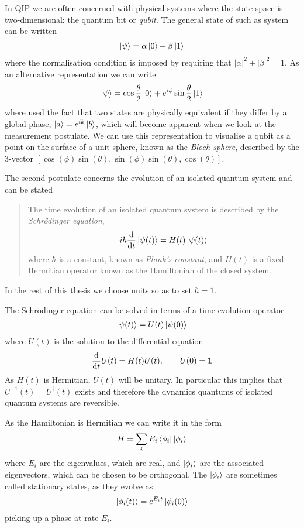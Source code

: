 In QIP we are often concerned with physical systems where the state space is two-dimensional: the quantum bit or \textit{qubit}. The general state of such as system can be written
\begin{align}
  \left\vert\psi\right\rangle = \alpha\left\vert0\right\rangle + \beta\left\vert1\right\rangle
\end{align}
where the normalisation condition is imposed by requiring that $|\alpha|^2 + |\beta|^2 = 1$. As an alternative representation we can write
\begin{align}
  \left\vert\psi\right\rangle = \cos\frac{\theta}{2}\left\vert0\right\rangle + e^{i\phi}\sin\frac{\theta}{2}\left\vert1\right\rangle
\end{align}
where used the fact that two states are physically equivalent if they differ by a global phase, $\left\vert a\right\rangle = e^{ik}\left\vert b\right\rangle$, which will become apparent when we look at the measurement postulate. We can use this representation to visualise a qubit as a point on the surface of a unit sphere, known as the \textit{Bloch sphere}, described by the $3$-vector $[\cos(\phi)\sin(\theta), \sin(\phi)\sin(\theta), \cos(\theta)]$.

The second postulate concerns the evolution of an isolated quantum system and can be stated
\begin{quotation}
The time evolution of an isolated quantum system is described by the \textit{Schr\"odinger equation},
\begin{align}
  \label{qd:schrodinger_eq}
  i\hbar\frac{\mathrm{d}}{\mathrm{d}t} \left\vert\psi(t)\right\rangle = H(t) \left\vert\psi(t)\right\rangle
\end{align}
where $\hbar$ is a constant, known as \textit{Plank's constant}, and $H(t)$ is a fixed Hermitian operator known as the Hamiltonian of the closed system.
\end{quotation}
In the rest of this thesis we choose units so as to set $\hbar = 1$. 

The Schr\"odinger equation can be solved in terms of a time evolution operator
\begin{align}
  \left\vert\psi(t)\right\rangle = U(t)\left\vert\psi(0)\right\rangle
\end{align}
where $U(t)$ is the solution to the differential equation
\begin{align}
  \frac{\mathrm{d}}{\mathrm{d}t} U(t) = H(t)U(t), \qquad U(0) = \mathbf{1}
\end{align}
As $H(t)$ is Hermitian, $U(t)$ will be unitary. In particular this implies that $U^{-1}(t) = U^\dagger(t)$ exists and therefore the dynamics quantums of isolated quantum systems are reversible.

As the Hamiltonian is Hermitian we can write it in the form
\begin{align}
  H = \sum_i E_i \left\langle \phi_i\right\vert\left\vert\phi_i\right\rangle
\end{align}
where $E_i$ are the eigenvalues, which are real, and $\left\vert\phi_i\right\rangle$ are the associated eigenvectors, which can be chosen to be orthogonal. The $\left\vert\phi_i\right\rangle$ are sometimes called stationary states, as they evolve as
\begin{align}
  \left\vert\phi_i(t)\right\rangle = e^{E_i t}\left\vert\phi_i(0)\right\rangle
\end{align}
picking up a phase at rate $E_i$.

